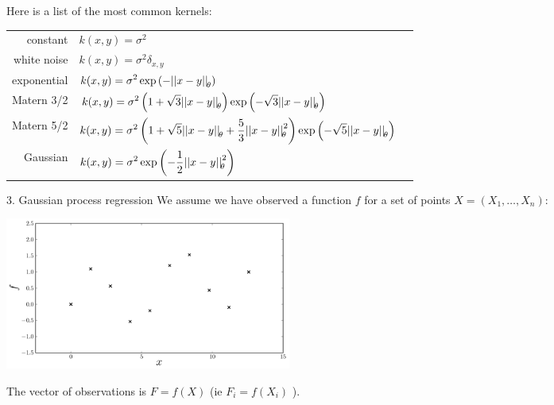 \begin{frame}{}
Here is a list of the most common kernels:\\
\vspace{2mm}
\footnotesize
\centering
\begin{tabular}{rlN}
		constant & $ \displaystyle k(x,y) = \sigma^2 $ &\\[4mm]
		white noise & $ \displaystyle k(x,y) = \sigma^2 \delta_{x,y} $ &\\[4mm]
		exponential & $\displaystyle k(x,y) = \sigma^2 \exp \left(- {|| x-y ||}_{\! \theta} \right)$ &\\[4mm]
		Matern 3/2 & $\displaystyle k(x,y) = \sigma^2 \left(1 + \sqrt{3}{|| x-y ||}_{\! \theta} \right) \exp \left(- \sqrt{3}{|| x-y ||}_{\! \theta}  \right)$ &\\[4mm]
		Matern 5/2 & $\displaystyle k(x,y) = \sigma^2 \left(1 + \sqrt{5}{|| x-y ||}_{\! \theta} + \frac{5}{3}{|| x-y ||}_{\! \theta}^2 \right) \exp \left(- \sqrt{5}{|| x-y ||}_{\! \theta} \right)$ &\\[4mm]
		Gaussian & $\displaystyle k(x,y) = \sigma^2 \exp \left(- \frac12 {|| x-y ||}_{\! \theta}^2 \right)$ &\\[4mm]
\end{tabular}
\end{frame}


\begin{frame}{3. Gaussian process regression}
We assume we have observed a function $f$ for a set of points $X = (X_1,\dots,X_n)$:
\begin{center}
\includegraphics[height=5cm]{1_stat_models/figures/R/Fig1-data}
\end{center}
The vector of observations is $F=f(X)$ (ie $F_i = f(X_i)$ ).
\end{frame}

